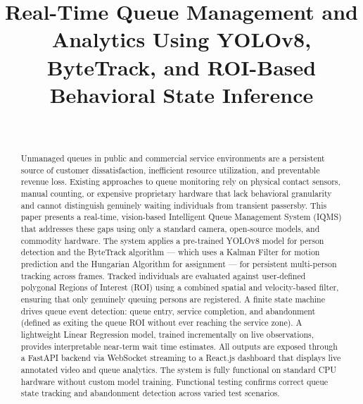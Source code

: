 \documentclass[journal, twocolumn]{IEEEtran}
\begin{document}
\title{Real-Time Queue Management and Analytics Using YOLOv8, ByteTrack, and ROI-Based Behavioral State Inference}

\author{
\\
}

\maketitle

\begin{abstract}
Unmanaged queues in public and commercial service environments are a persistent source of customer dissatisfaction, inefficient resource utilization, and preventable revenue loss. Existing approaches to queue monitoring rely on physical contact sensors, manual counting, or expensive proprietary hardware that lack behavioral granularity and cannot distinguish genuinely waiting individuals from transient passersby. This paper presents a real-time, vision-based Intelligent Queue Management System (IQMS) that addresses these gaps using only a standard camera, open-source models, and commodity hardware. The system applies a pre-trained YOLOv8 model for person detection and the ByteTrack algorithm — which uses a Kalman Filter for motion prediction and the Hungarian Algorithm for assignment — for persistent multi-person tracking across frames. Tracked individuals are evaluated against user-defined polygonal Regions of Interest (ROI) using a combined spatial and velocity-based filter, ensuring that only genuinely queuing persons are registered. A finite state machine drives queue event detection: queue entry, service completion, and abandonment (defined as exiting the queue ROI without ever reaching the service zone). A lightweight Linear Regression model, trained incrementally on live observations, provides interpretable near-term wait time estimates. All outputs are exposed through a FastAPI backend via WebSocket streaming to a React.js dashboard that displays live annotated video and queue analytics. The system is fully functional on standard CPU hardware without custom model training. Functional testing confirms correct queue state tracking and abandonment detection across varied test scenarios.
\end{abstract}
\end{document}
